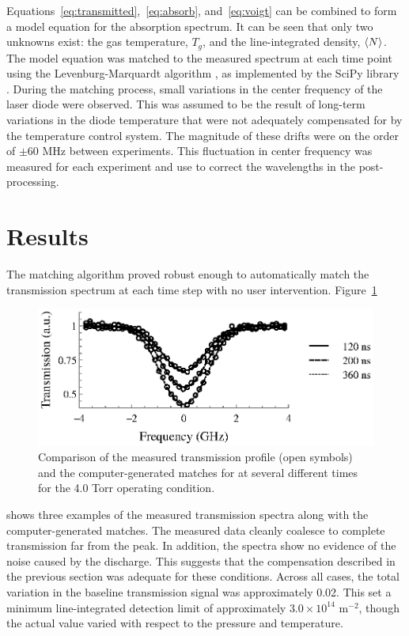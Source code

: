 Equations~\ref{eq:transmitted},~\ref{eq:absorb}, and~\ref{eq:voigt} can be
combined to form a model equation for the absorption spectrum. It can be seen
that only two unknowns exist: the gas temperature, $T_g$, and the
line-integrated density, $\langle N \rangle$. The model equation was matched to the measured
spectrum at each time point using the Levenburg-Marquardt algorithm
\cite{Marquardt1963}, as implemented by the SciPy library \cite{Jones2001}.
During the matching process, small variations in the center frequency of the
laser diode were observed. This was assumed to be the result of long-term
variations in the diode temperature that were not adequately compensated for by
the temperature control system. The magnitude of these drifts were on the order
of $\pm60$ MHz between experiments. This fluctuation in center frequency was
measured for each experiment and use to correct the wavelengths in the
post-processing.

\section{Results}

The matching algorithm proved robust enough to automatically match the
transmission spectrum at each time step with no user intervention.
Figure~\ref{fig:matching}
\begin{figure}
  \centering
  \includegraphics{./chapters/metastables/figures/matching.eps}
  \caption{Comparison of the measured transmission profile (open symbols) and
  the computer-generated matches for at several different times for the 4.0 Torr
  operating condition.}
  \label{fig:matching}
\end{figure}
shows three examples of the measured transmission spectra along with the
computer-generated matches. The measured data cleanly coalesce to complete
transmission far from the peak. In addition, the spectra show no evidence of the
noise caused by the discharge. This suggests that the compensation described in
the previous section was adequate for these conditions. Across all cases, the
total variation in the baseline transmission signal was approximately 0.02. This
set a minimum line-integrated detection limit of approximately $3.0 \times
10^{14}$ m$^{-2}$, though the actual value varied with respect to the pressure
and temperature.

